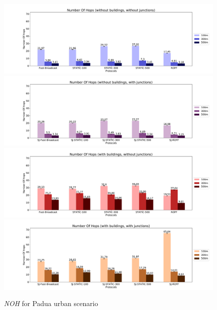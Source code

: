 		\begin{figure}[H]
			\centering
			\includegraphics[width=1.0\textwidth]{immagini/padua-25/b0/j0/noh}
			\includegraphics[width=1.0\textwidth]{immagini/padua-25/b0/j1/noh}
			\includegraphics[width=1.0\textwidth]{immagini/padua-25/b1/j0/noh}
			\includegraphics[width=1.0\textwidth]{immagini/padua-25/b1/j1/noh}
			\caption{\textit{NOH} for Padua urban scenario}
			\label{fig:padua-25-noh}
		\end{figure}
		
